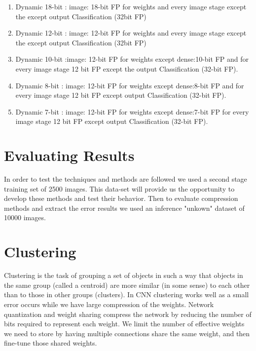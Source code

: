 \begin{small}
\begin{enumerate}
\item  Dynamic 18-bit : image: 18-bit FP for weights and every image stage except the except output Classification (32bit FP) \\
\item Dynamic 12-bit : image: 12-bit FP for weights and every image stage except the except output Classification (32bit FP) \\
\item Dynamic 10-bit :image: 12-bit FP for weights except dense:10-bit FP and for every  image stage 12 bit FP except the output Classification (32-bit FP). \\
\item Dynamic  8-bit : image: 12-bit FP for weights except dense:8-bit FP and for every image stage 12 bit FP except output Classification (32-bit FP). \\
\item Dynamic 7-bit : image: 12-bit FP for weights except dense:7-bit FP  for every image stage 12 bit FP except output Classification (32-bit FP). \\
\end{enumerate}
\end{small}

\section{Evaluating Results}
In order to test the techniques and methods are followed we used a second stage training set of 2500 images. This data-set will provide us the opportunity to develop these methods and test
their behavior. Then to evaluate compression methods and extract the error results we used an inference "unkown" dataset of 10000 images.


 \section{Clustering}
Clustering is the task of grouping a set of objects in such a way that objects in the same group (called a centroid) are more similar (in some sense) to each other than to those in other groups (clusters). In CNN clustering works well as a small error occurs while we have large compression of the weights.
Network quantization and weight sharing compress the network by reducing the number of bits required to represent each weight. We limit the number of effective weights we need to store by having multiple connections share the same weight, and then fine-tune those shared weights.


